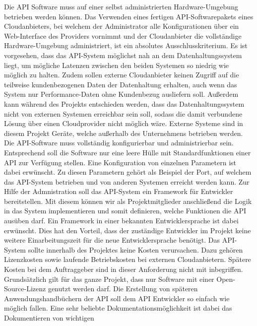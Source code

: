 {\begin{outline}
  \1 Die API Software muss auf einer selbst administrierten
  Hardware\hyp{}Umgebung betrieben werden können. Das Verwenden eines fertigen
  API\hyp{}Softwarepakets eines Cloudanbieters, bei welchem der Administrator
  alle Konfigurationen über ein Web\hyp{}Interface des Providers vornimmt und
  der Cloudanbieter die vollständige Hardware\hyp{}Umgebung administriert, ist
  ein absolutes Ausschlusskriterium. Es ist vorgesehen, dass das
  API\hyp{}System möglichst nah an dem Datenhaltungssystem liegt, um mögliche
  Latenzen zwischen den beiden Systemen so niedrig wie möglich zu halten. Zudem
  sollen externe Cloudanbieter keinen Zugriff auf die teilweise kundenbezogenen
  Daten der Datenhaltung erhalten, auch wenn das System nur
  Performance\hyp{}Daten ohne Kundenbezug ausliefern soll. Außerdem kann
  während des Projekts entschieden werden, dass das Datenhaltungssystem nicht
  von externen Systemen erreichbar sein soll, sodass die damit verbundene
  Lösung über einen Cloudprovider nicht möglich wäre. Externe Systeme sind in
  diesem Projekt Geräte, welche außerhalb des Unternehmens betrieben werden.
  \1 Die API\hyp{}Software muss vollständig konfigurierbar und administrierbar
  sein.  Entsprechend soll die Software nur eine leere Hülle mit
  Standardfunktionen einer API zur Verfügung stellen. Eine Konfiguration von
  einzelnen Parametern ist dabei erwünscht. Zu diesen Parametern gehört als
  Beispiel der Port, auf welchem das API\hyp{}System betrieben und von anderen
  Systemen erreicht werden kann. Zur Hilfe der Admnistration soll das
  API\hyp{}System ein Framework für Entwickler bereitstellen. Mit diesem können
  wir als Projektmitglieder anschließend die Logik in das System implementieren
  und somit definieren, welche Funktionen die API ausüben darf. Ein Framework
  in einer bekannten Entwicklersprache ist dabei erwünscht. Dies hat den
  Vorteil, dass der zuständige Entwickler im Projekt keine weitere
  Einarbeitungszeit für die neue Entwicklersprache benötigt.
  \1 Das API\hyp{}System sollte innerhalb des Projektes keine Kosten
  verursachen.  Dazu gehören Lizenzkosten sowie laufende Betriebskosten bei
  externen Cloudanbietern. Spätere Kosten bei dem Auftraggeber sind in dieser
  Anforderung nicht mit inbegriffen. Grundsätzlich gilt für das ganze Projekt,
  dass nur Software mit einer Open\hyp{}Source\hyp{}Lizenz genutzt werden darf.
  \1 Die Erstellung von späteren Anwendungshandbüchern der API soll dem API
  Entwickler so einfach wie möglich fallen. Eine sehr beliebte
  Dokumentationsmöglichkeit ist dabei das Dokumentieren von wichtigen

\end{outline}}
